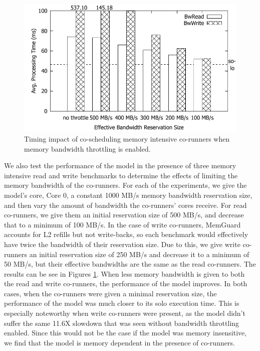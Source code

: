 \begin{figure}[h]
  \centering
  \includegraphics[width=.45\textwidth]{figs/memguard_bandwidth}
  \caption{Timing impact of co-scheduling memory intensive
co-runners when memory bandwidth throttling is enabled. }
  \label{fig:memguard_bandwidth}
\end{figure}


We also test the performance of the model in the presence of three
memory intensive read and write benchmarks to determine the effects of 
limiting the memory bandwidth of the co-runners. For each of the 
experiments, we give the model's core, Core 0, a constant 1000 MB/s 
memory bandwidth reservation size, and then vary the amount of bandwidth 
the co-runners' cores receive. For read co-runners, we give them an initial
reservation size of 500 MB/s, and decrease that to a minimum of 100 MB/s.
In the case of write co-runners, MemGuard accounts for L2 refills but not
write-backs, so each benchmark would effectively have twice the bandwidth
of their reservation size. Due to this, we give write co-runners an initial 
reservation size of 250 MB/s and decrease it to a minimum of 50 MB/s, but
their effective bandwidths are the same as the read co-runners.
The results can be see in Figures \ref{fig:memguard_bandwidth}. 
When less memory bandwidth is given to both the read and write 
co-runners, the performance of the model improves. 
In both cases, when the co-runners were given a minimal reservation size,
the performance of the model was much closer to its solo execution time.
This is especially noteworthy when write co-runners were present, as the 
model didn't suffer the same 11.6X slowdown that was seen without
bandwidth throttling enabled. 
Since this would not be the case if the 
model was memory insensitive, we find that the model is memory 
dependent in the presence of co-runners.

